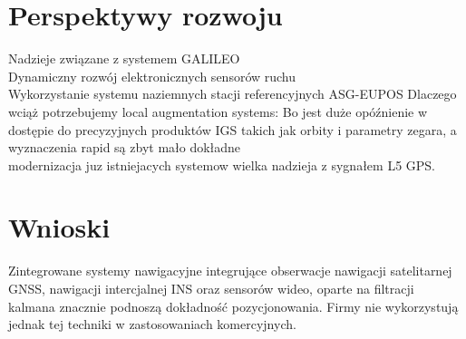 \section{Perspektywy rozwoju}
Nadzieje związane z systemem GALILEO\\
\indent Dynamiczny rozwój elektronicznych sensorów ruchu\\
\indent Wykorzystanie systemu naziemnych stacji referencyjnych ASG-EUPOS
Dlaczego wciąż potrzebujemy local augmentation systems:
Bo jest duże opóźnienie w dostępie do precyzyjnych produktów IGS takich jak orbity i parametry zegara,
a wyznaczenia rapid są zbyt mało dokładne \cite[][strona 215]{ggos}\\
\indent modernizacja juz istniejacych systemow
wielka nadzieja z sygnałem L5 GPS.

\section{Wnioski}
Zintegrowane systemy nawigacyjne integrujące obserwacje nawigacji satelitarnej GNSS, nawigacji intercjalnej INS oraz sensorów wideo, oparte na filtracji
kalmana znacznie podnoszą dokładność pozycjonowania. Firmy nie wykorzystują jednak tej techniki w zastosowaniach komercyjnych.  
